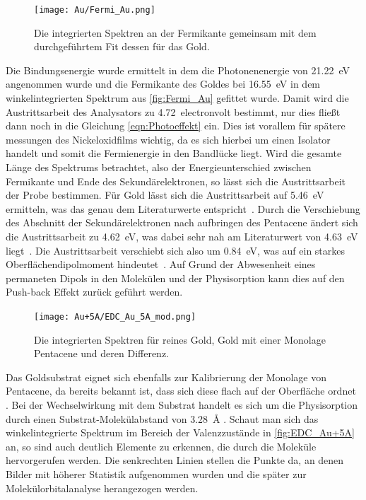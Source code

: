         \begin{figure}
            \centering
            \texttt{[image: Au/Fermi\_Au.png]}
            \caption{Die integrierten Spektren an der Fermikante gemeinsam mit dem durchgeführtem Fit dessen für das Gold.}
            \label{fig:Fermi_Au}
        \end{figure}
        Die Bindungsenergie wurde ermittelt in dem die Photonenenergie von \SI{21.22}{\electronvolt} angenommen wurde und die Fermikante des Goldes bei \SI{16.55}{\electronvolt} in dem winkelintegrierten Spektrum aus \autoref{fig:Fermi_Au} gefittet wurde.
        Damit wird die Austrittsarbeit des Analysators zu \SI{4.72}{electronvolt} bestimmt, nur dies fließt dann noch in die Gleichung \ref{eqn:Photoeffekt} ein.
        Dies ist vorallem für spätere messungen des Nickeloxidfilms wichtig, da es sich hierbei um einen Isolator handelt und somit die Fermienergie in den Bandlücke liegt.
        Wird die gesamte Länge des Spektrums betrachtet, also der Energieunterschied zwischen Fermikante und Ende des Sekundärelektronen, so lässt sich die Austrittsarbeit der Probe bestimmen.
        Für Gold lässt sich die Austrittsarbeit auf \SI{5.46}{\electronvolt} ermitteln, was das genau dem Literaturwerte entspricht~\cite{5A_4}.
        Durch die Verschiebung des Abschnitt der Sekundärelektronen nach aufbringen des Pentacene ändert sich die Austrittsarbeit zu \SI{4.62}{\electronvolt}, was dabei sehr nah am Literaturwert von \SI{4.63}{\electronvolt} liegt~\cite{5A_4}.
        Die Austrittsarbeit verschiebt sich also um \SI{0.84}{\electronvolt}, was auf ein starkes Oberflächendipolmoment hindeutet~\cite{5A_3}.
        Auf Grund der Abwesenheit eines permaneten Dipols in den Molekülen und der Physisorption kann dies auf den Push-back Effekt zurück geführt werden.

        \begin{figure}
            \centering
            \texttt{[image: Au+5A/EDC\_Au\_5A\_mod.png]}
            \caption{Die integrierten Spektren für reines Gold, Gold mit einer Monolage Pentacene und deren Differenz.}
            \label{fig:EDC_Au+5A}
        \end{figure}
        Das Goldsubstrat eignet sich ebenfalls zur Kalibrierung der Monolage von Pentacene, da bereits bekannt ist, dass sich diese flach auf der Oberfläche ordnet \cite{5A_1}.
        Bei der Wechselwirkung mit dem Substrat handelt es sich um die Physisorption durch einen Substrat-Molekülabstand von \SI{3.28}{\angstrom} \cite{5A_1}.
        Schaut man sich das winkelintegrierte Spektrum im Bereich der Valenzzustände in \autoref{fig:EDC_Au+5A} an, so sind auch deutlich Elemente zu erkennen, die durch die Moleküle hervorgerufen werden.
        Die senkrechten Linien stellen die Punkte da, an denen Bilder mit höherer Statistik aufgenommen wurden und die später zur Molekülorbitalanalyse herangezogen werden.


